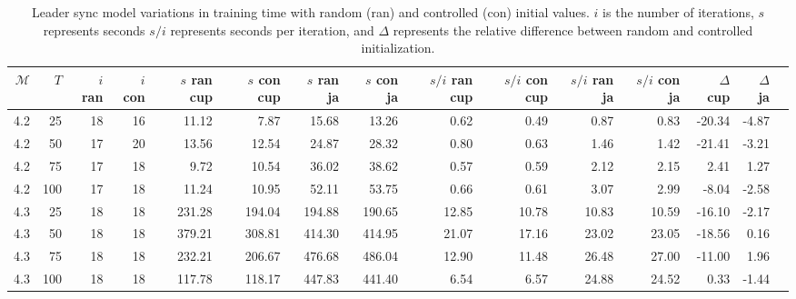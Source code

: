 \begin{table*}
    \centering
    \caption{Leader sync model variations in training time with random (ran) and controlled (con) initial values. $i$ is the number of iterations, $s$ represents seconds $s/i$ represents seconds per iteration, and $\Delta$ represents the relative difference between random and controlled initialization.}
    \label{tab:leader_results_rand_vs_semi}
    \begin{tabular}{rrrrrrrrrrrrrrr}
        \toprule
        $\mathcal{M}$ & $T$ & $i$ ran & $i$ con & $s$ ran cup & $s$ con cup & $s$ ran ja & $s$ con ja & $s/i$ ran cup & $s/i$ con cup & $s/i$ ran ja & $s/i$ con ja & $\Delta$ cup & $\Delta$ ja \\
        \midrule
        4.2           & 25  & 18      & 16      & 11.12       & 7.87        & 15.68      & 13.26      & 0.62          & 0.49          & 0.87         & 0.83         & -20.34       & -4.87       \\
        4.2           & 50  & 17      & 20      & 13.56       & 12.54       & 24.87      & 28.32      & 0.80          & 0.63          & 1.46         & 1.42         & -21.41       & -3.21       \\
        4.2           & 75  & 17      & 18      & 9.72        & 10.54       & 36.02      & 38.62      & 0.57          & 0.59          & 2.12         & 2.15         & 2.41         & 1.27        \\
        4.2           & 100 & 17      & 18      & 11.24       & 10.95       & 52.11      & 53.75      & 0.66          & 0.61          & 3.07         & 2.99         & -8.04        & -2.58       \\
        4.3           & 25  & 18      & 18      & 231.28      & 194.04      & 194.88     & 190.65     & 12.85         & 10.78         & 10.83        & 10.59        & -16.10       & -2.17       \\
        4.3           & 50  & 18      & 18      & 379.21      & 308.81      & 414.30     & 414.95     & 21.07         & 17.16         & 23.02        & 23.05        & -18.56       & 0.16        \\
        4.3           & 75  & 18      & 18      & 232.21      & 206.67      & 476.68     & 486.04     & 12.90         & 11.48         & 26.48        & 27.00        & -11.00       & 1.96        \\
        4.3           & 100 & 18      & 18      & 117.78      & 118.17      & 447.83     & 441.40     & 6.54          & 6.57          & 24.88        & 24.52        & 0.33         & -1.44       \\

\end{tabular}
\end{table*}
